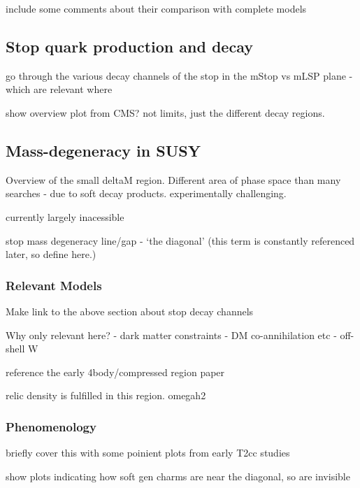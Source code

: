 include some comments about their comparison with complete models


\subsection{Stop quark production and decay}
go through the various decay channels of the stop in the mStop vs mLSP plane
- which are relevant where

show overview plot from CMS? not limits, just the different decay regions.

\subsection{Mass-degeneracy in SUSY}
Overview of the small deltaM region. Different area of phase space than many
searches - due to soft decay products. experimentally challenging.

currently largely inacessible

stop mass degeneracy line/gap - `the diagonal' (this term is constantly
referenced later, so define here.)

\subsubsection{Relevant Models}
Make link to the above section about stop decay channels

Why only relevant here?
- dark matter constraints - DM co-annihilation etc
- off-shell W

reference the early 4body/compressed region paper

relic density is fulfilled in this region. omegah2

\subsubsection{Phenomenology}
briefly cover this with some poinient plots from early T2cc studies

show plots indicating how soft gen charms are near the diagonal, so are
invisible

